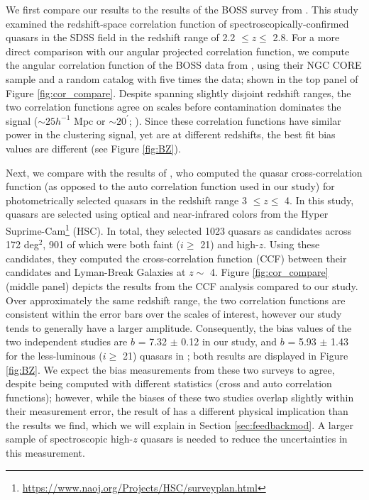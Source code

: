 \documentclass[apj, numberedappendix]{emulateapj}
\begin{document}
We first compare our results to the results of the BOSS survey from \citet{Eft2015}. This study examined the redshift-space correlation function of spectroscopically-confirmed quasars in the SDSS field in the redshift range of 2.2 $\leq z \leq$ 2.8. For a more direct comparison with our angular projected correlation function, we compute the angular correlation function of the BOSS data from \citet{Eft2015}, using their NGC CORE sample and a random catalog with five times the data; shown in the top panel of Figure \ref{fig:cor_compare}. Despite spanning slightly disjoint redshift ranges, the two correlation functions agree on scales before contamination dominates the signal ($\sim 25 h^{-1}$ Mpc or $\sim 20^\prime$; \citealt{Eft2015}). Since these correlation functions have similar power in the clustering signal, yet are at different redshifts, the best fit bias values are different (see Figure \ref{fig:BZ}). 

Next, we compare with the results of \citet{He2017}, who computed the quasar cross-correlation function (as opposed to the auto correlation function used in our study) for photometrically selected quasars in the redshift range 3 $\leq z \leq$ 4. In this study, quasars are selected using optical and near-infrared colors from the Hyper Suprime-Cam\footnote{\url{https://www.naoj.org/Projects/HSC/surveyplan.html}} (HSC). In total, they selected 1023 quasars as candidates across 172 deg$^2$, 901 of which were both faint ($i \geq$ 21) and high-$z$. Using these candidates, they computed the cross-correlation function (CCF) between their candidates and Lyman-Break Galaxies at $z \sim$ 4. Figure \ref{fig:cor_compare} (middle panel) depicts the results from the CCF analysis compared to our study. Over approximately the same redshift range, the two correlation functions are consistent within the error bars over the scales of interest, however our study tends to generally have a larger amplitude. Consequently, the bias values of the two independent studies are $b$ = 7.32 $\pm$ 0.12 in our study, and $b$ = 5.93 $\pm$ 1.43 for the less-luminous ($i \geq$ 21) quasars in \citet{He2017}; both results are displayed in Figure \ref{fig:BZ}. We expect the bias measurements from these two surveys to agree, despite being computed with different statistics (cross and auto correlation functions); however, while the biases of these two studies overlap slightly within their measurement error, the result of \citet{He2017} has a different physical implication than the results we find, which we will explain in Section \ref{sec:feedbackmod}. A larger sample of spectroscopic high-$z$ quasars is needed to reduce the uncertainties in this measurement. 
\end{document}
